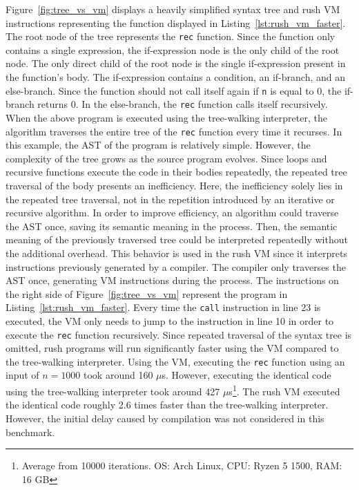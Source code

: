 Figure~\ref{fig:tree_vs_vm} displays a heavily simplified syntax tree and rush VM instructions representing the function displayed in Listing~\ref{lst:rush_vm_faster}.
The root node of the tree represents the \texttt{rec} function.
Since the function only contains a single expression, the if-expression node is the only child of the root node.
The only direct child of the root node is the single if-expression present in the function's body.
The if-expression contains a condition, an if-branch, and an else-branch.
Since the function should not call itself again if \texttt{n} is equal to 0, the if-branch returns 0.
In the else-branch, the \texttt{rec} function calls itself recursively.
When the above program is executed using the tree-walking interpreter, the algorithm traverses the entire tree of the \texttt{rec} function every time it recurses.
In this example, the AST of the program is relatively simple.
However, the complexity of the tree grows as the source program evolves.
Since loops and recursive functions execute the code in their bodies repeatedly, the repeated tree traversal of the body presents an inefficiency.
Here, the inefficiency solely lies in the repeated tree traversal, not in the repetition introduced by an iterative or recursive algorithm.
In order to improve efficiency, an algorithm could traverse the AST once, saving its semantic meaning in the process.
Then, the semantic meaning of the previously traversed tree could be interpreted repeatedly without the additional overhead.
This behavior is used in the rush VM since it interprets instructions previously generated by a compiler.
The compiler only traverses the AST once, generating VM instructions during the process.
The instructions on the right side of Figure~\ref{fig:tree_vs_vm} represent the program in Listing~\ref{lst:rush_vm_faster}.
Every time the \texttt{call} instruction in line 23 is executed, the VM only needs to jump to the instruction in line 10 in order to execute the \texttt{rec} function recursively.
Since repeated traversal of the syntax tree is omitted, rush programs will run significantly faster using the VM compared to the tree-walking interpreter.
Using the VM, executing the \texttt{rec} function using an input of $n = 1000$ took around 160 $\mu$s.
However, executing the identical code using the tree-walking interpreter took around 427 $\mu$s\footnote{Average from 10000 iterations. OS: Arch Linux, CPU: Ryzen 5 1500, RAM: 16 GB}.
The rush VM executed the identical code roughly 2.6 times faster than the tree-walking interpreter.
However, the initial delay caused by compilation was not considered in this benchmark.

